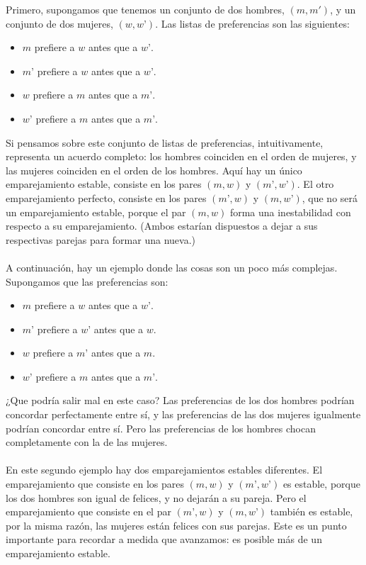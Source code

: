 \documentclass[a4paper]{article}
\begin{document}
	Primero, supongamos que tenemos un conjunto de dos hombres, $(m,m')$, y un conjunto de dos mujeres, $(w, w’)$.  Las listas de preferencias son las siguientes:

   \begin{itemize}
      \item $m$ prefiere a $w$ antes que a $w’$.
      \item $m’$ prefiere a $w$ antes que a $w’$.
      \item $w$ prefiere a $m$ antes que a $m’$.
      \item $w’$ prefiere a $m$ antes que a $m’$.
    \end{itemize}
	Si pensamos sobre este conjunto de listas de preferencias, intuitivamente, representa un acuerdo completo: los hombres coinciden en el orden de mujeres, y las mujeres coinciden en el orden de los hombres. Aquí hay un único emparejamiento estable, consiste en los pares $(m,w)$ y $(m’,w’)$. El otro emparejamiento perfecto, consiste en los pares $(m’,w)$ y $(m,w’)$, que no será un emparejamiento estable, porque el par $(m,w)$ forma una inestabilidad con respecto a su emparejamiento. (Ambos estarían dispuestos a dejar a sus respectivas parejas para formar una nueva.)
    \\
    \\
A continuación, hay un ejemplo donde las cosas son un poco más complejas. Supongamos que las preferencias son: 
   \begin{itemize}
      \item $m$ prefiere a $w$ antes que a $w’$.
      \item $m’$ prefiere a $w’$ antes que a $w$.
      \item $w$ prefiere a $m’$ antes que a $m$.
      \item $w’$ prefiere a $m$ antes que a $m’$.
    \end{itemize}
¿Que podría salir mal en este caso? Las preferencias de los dos hombres podrían concordar perfectamente entre sí, y las preferencias de las dos mujeres igualmente podrían concordar entre sí.  Pero las preferencias de los hombres chocan completamente con la de las mujeres. 
\\
\\
En este segundo ejemplo hay dos emparejamientos estables diferentes. El emparejamiento que consiste en los pares $(m, w)$ y $(m’,w’)$ es estable, porque los dos hombres son igual de felices, y no dejarán a su pareja. Pero el emparejamiento que consiste en el par $(m’,w)$ y $(m,w’)$ también es estable, por la misma razón, las mujeres están felices con sus parejas. Este es un punto importante para recordar a medida que avanzamos: es posible más de un emparejamiento estable.
\\
\end{document}
